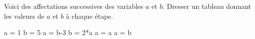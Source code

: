 Voici des affectations successives des variables $a$ et $b$. Dresser un tableau donnant les valeurs 
de $a$ et $b$ à chaque étape.

\begin{pyconsole}
a = 1
b = 5
a = b-3 
b = 2*a 	
a = a
a = b	
\end{pyconsole}
